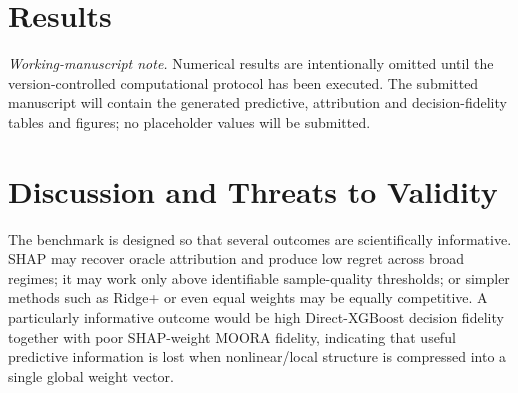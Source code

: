 \documentclass[runningheads]{llncs}
\newif\ifresultsavailable
\begin{document}
\section{Results}
\label{sec:results}

\ifresultsavailable
%
% 
% 
% 
% 
% 
% 
%
%
\else
\noindent\textit{Working-manuscript note.} Numerical results are intentionally omitted until the
version-controlled computational protocol has been executed. The submitted manuscript will
contain the generated predictive, attribution and decision-fidelity tables and figures; no
placeholder values will be submitted.
\fi

\section{Discussion and Threats to Validity}
\label{sec:discussion}

The benchmark is designed so that several outcomes are scientifically informative. SHAP may
recover oracle attribution and produce low regret across broad regimes; it may work only above
identifiable sample-quality thresholds; or simpler methods such as Ridge+ or even equal weights
may be equally competitive. A particularly informative outcome would be high Direct-XGBoost
decision fidelity together with poor SHAP-weight MOORA fidelity, indicating that useful
predictive information is lost when nonlinear/local structure is compressed into a single
global weight vector.
\end{document}
